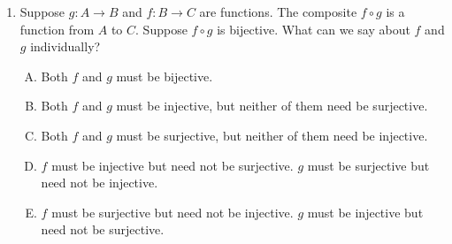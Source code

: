 \documentclass[10pt]{amsart}
\begin{document}
\begin{enumerate}
  \begin{enumerate}[(A)]
  \item $f \circ g$ is surjective if and only if $f$ and $g$ are both
    surjective.
  \item If $f$ and $g$ are both surjective, then $f \circ g$ is
    surjective. However, $f \circ g$ being surjective does not imply
    anything about the surjectivity of either $f$ or $g$.
  \item If $f$ and $g$ are both surjective, then $f \circ g$ is
    surjective. If $f \circ g$ is surjective, then at least one of $f$
    and $g$ is surjective, but we cannot conclusively say for any
    specific one of the two that it must be surjective.
  \item If $f$ and $g$ are both surjective, then $f \circ g$ is
    surjective. If $f \circ g$ is surjective, then $f$ is surjective,
    but we do not have enough information to deduce whether $g$ is
    surjective.
  \item If $f$ and $g$ are both surjective, then $f \circ g$ is
    surjective. If $f \circ g$ is surjective, then $g$ is surjective,
    but we do not have enough information to deduce whether $f$ is surjective.
  \end{enumerate}

  {\em Answer}: Option (D)

  {\em Explanation}: See the lecture notes for more details (note that
  the roles of $f$ and $g$ are reversed in the lecture notes).

  {\em Performance review}: 22 out of 27 got this. 3 chose (A), 1 each
  chose (B) and (E).

  {\em Historical note (last time)}: $23$ out of $26$ got this. $2$ chose (E),
  $1$ chose (A).

\item Suppose $g:A \to B$ and $f:B \to C$ are functions. The composite
  $f \circ g$ is a function from $A$ to $C$. Suppose $f \circ g$ is
  bijective. What can we say about $f$ and $g$ individually?

  \begin{enumerate}[(A)]
  \item Both $f$ and $g$ must be bijective.
  \item Both $f$ and $g$ must be injective, but neither of them need be surjective.
  \item Both $f$ and $g$ must be surjective, but neither of them need be injective.
  \item $f$ must be injective but need not be surjective. $g$ must be
    surjective but need not be injective.
  \item $f$ must be surjective but need not be injective. $g$ must be
    injective but need not be surjective.
  \end{enumerate}


\end{enumerate}
\end{document}

